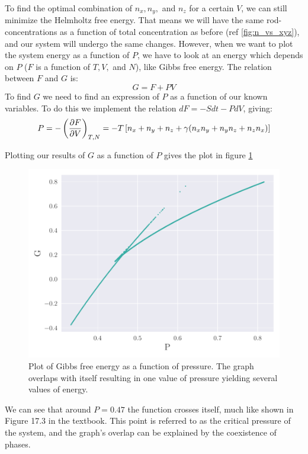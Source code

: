     To find the optimal combination of $n_x, n_y,$ and $n_z$ for a certain $V$, we can still minimize the Helmholtz free energy. That means we will have the same rod-concentrations as a function of total concentration as before (ref \cref{fig:n_vs_xyz}), and our system will undergo the same changes. However, when we want to plot the system energy as a function of $P$, we have to look at an energy which depends on $P$ ($F$ is a function of $T, V,$ and $N$), like Gibbs free energy. The relation between $F$ and $G$ is:
    \begin{equation}
        G = F + PV
    \end{equation} 
    To find $G$ we need to find an expression of $P$ as a function of our known variables. To do this we implement the relation $dF = -S dt - P dV$, giving:
    \begin{equation}
        P = -\left(\pdv{F}{V}\right)_{T,N} = - T \left[n_x + n_y + n_z + \gamma (n_x n_y + n_y n_z + n_z n_x)\right]
    \end{equation}
    
    Plotting our results of $G$ as a function of $P$ gives the plot in figure \cref{fig:gibbs}
    \begin{figure}
        \centering 
        \includegraphics[width=.7\textwidth]{./figs/gibbs.pdf}
        \caption{Plot of Gibbs free energy as a function of pressure. The graph overlaps with itself resulting in one value of pressure yielding several values of energy.}
        \label{fig:gibbs}
    \end{figure}
    We can see that around $P=0.47$ the function crosses itself, much like shown in Figure 17.3 in the textbook. This point is referred to as the critical pressure of the system, and the graph's overlap can be explained by the coexistence of phases. 
    

